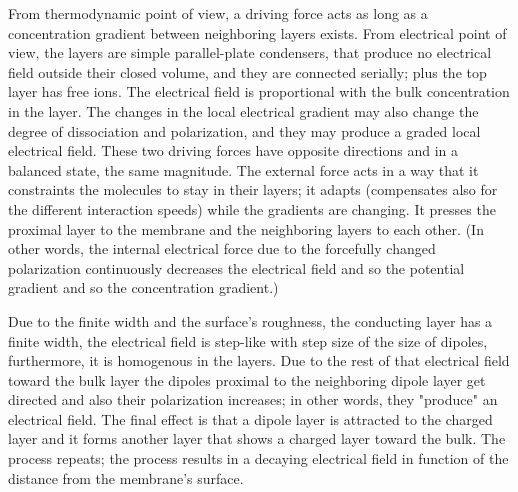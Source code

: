  From thermodynamic point of view, a driving force acts
as long as a concentration gradient between neighboring layers exists. 
From electrical point of view, the layers are simple parallel-plate condensers,
that produce no electrical field outside their closed volume,
and they are connected serially; plus the top layer has free ions. The electrical field is proportional with the bulk concentration in the layer.
The changes in the local electrical gradient may also change the degree of dissociation and polarization, and they may produce a graded local electrical field. %
These two driving forces have opposite directions
and in a balanced state, the same magnitude.
The external force acts in a way that it constraints the molecules to stay in their layers; it adapts
(compensates also for the different interaction speeds)
while the gradients are changing. It presses the proximal layer to the membrane and the neighboring layers to each other.
(In other words, the internal electrical force due to the forcefully changed polarization continuously decreases the 
electrical field and so the potential gradient and so the concentration gradient.)


Due to the finite width and the surface's roughness, the conducting layer has a finite width, the electrical field is step-like with step size of the size of dipoles, furthermore, it is homogenous in the layers. Due to the rest of that electrical field toward the bulk layer the dipoles proximal to the neighboring dipole layer get directed and also their polarization increases; in other words, they "produce" an electrical field.
The final effect is that a dipole layer is attracted to
the charged layer and it forms another layer that shows 
a charged layer toward the bulk. %
The process repeats; the process results in 
a decaying electrical field in function of the distance from the membrane's surface.


